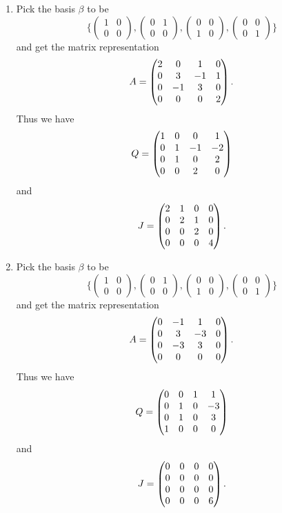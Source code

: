 \begin{enumerate}
\begin{enumerate}
\item Pick the basis $\beta $ to be 
\[\{\begin{pmatrix}1&0\\0&0\end{pmatrix},\begin{pmatrix}0&1\\0&0\end{pmatrix},\begin{pmatrix}0&0\\1&0\end{pmatrix},\begin{pmatrix}0&0\\0&1\end{pmatrix}\}\]
and get the matrix representation 
\[A=\begin{pmatrix}2 & 0 & 1 & 0\cr 0 & 3 & -1 & 1\cr 0 & -1 & 3 & 0\cr 0 & 0 & 0 & 2\end{pmatrix}.\]
Thus we have 
\[Q=\begin{pmatrix}1 & 0 & 0 & 1\cr 0 & 1 & -1 & -2\cr 0 & 1 & 0 & 2\cr 0 & 0 & 2 & 0\end{pmatrix}\]
and 
\[J=\begin{pmatrix}2 & 1 & 0 & 0\cr 0 & 2 & 1 & 0\cr 0 & 0 & 2 & 0\cr 0 & 0 & 0 & 4\end{pmatrix}.\]
\item Pick the basis $\beta $ to be 
\[\{\begin{pmatrix}1&0\\0&0\end{pmatrix},\begin{pmatrix}0&1\\0&0\end{pmatrix},\begin{pmatrix}0&0\\1&0\end{pmatrix},\begin{pmatrix}0&0\\0&1\end{pmatrix}\}\]
and get the matrix representation 
\[A=\begin{pmatrix}0 & -1 & 1 & 0\cr 0 & 3 & -3 & 0\cr 0 & -3 & 3 & 0\cr 0 & 0 & 0 & 0\end{pmatrix}.\]
Thus we have 
\[Q=\begin{pmatrix}0 & 0 & 1 & 1\cr 0 & 1 & 0 & -3\cr 0 & 1 & 0 & 3\cr 1 & 0 & 0 & 0\end{pmatrix}\]
and 
\[J=\begin{pmatrix}0 & 0 & 0 & 0\cr 0 & 0 & 0 & 0\cr 0 & 0 & 0 & 0\cr 0 & 0 & 0 & 6\end{pmatrix}.\]

\end{enumerate}
\end{enumerate}
